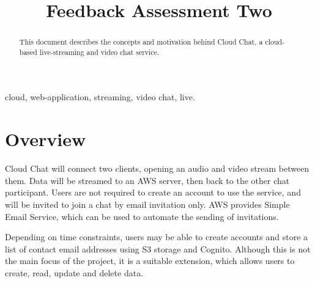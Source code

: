 \documentclass[conference]{IEEEtran}
\begin{document}
\title{Feedback Assessment Two\\}

\author{
}

\maketitle

\begin{abstract}
This document describes the concepts and motivation behind Cloud Chat, a cloud-based live-streaming and video chat service.
\end{abstract}
\begin{IEEEkeywords}
cloud, web-application, streaming, video chat, live.
\end{IEEEkeywords}
\section{Overview}
Cloud Chat will connect two clients, opening an audio and video stream between them. Data will be streamed to an AWS server, then back to the other chat participant. Users are not required to create an account to use the service, and will be invited to join a chat by email invitation only. AWS provides Simple Email Service, which can be used to automate the sending of invitations.
\par
Depending on time constraints, users may be able to create accounts and store a list of contact email addresses using S3 storage and Cognito. Although this is not the main focus of the project, it is a suitable extension, which allows users to create, read, update and delete data. 
\end{document}
